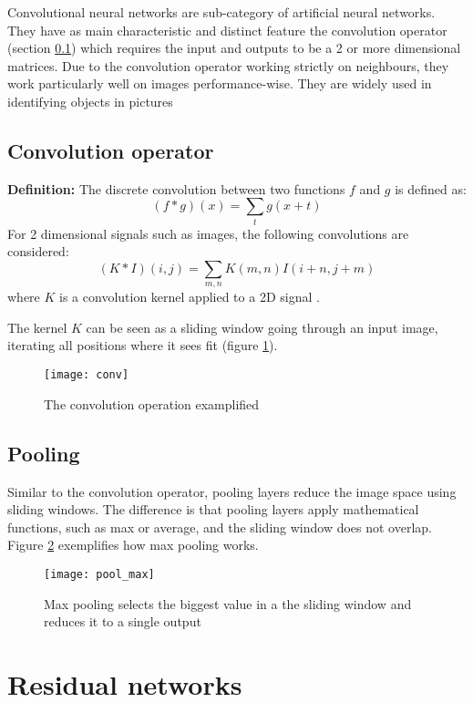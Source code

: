 Convolutional neural networks are sub-category of artificial neural networks. They have as main characteristic and distinct feature the convolution operator (section \ref{subsec:obj_cnn_conv}) which requires the input and outputs to be a 2 or more dimensional matrices. Due to the convolution operator working strictly on neighbours, they work particularly well on images performance-wise. They are widely used in identifying objects in pictures

\subsection{Convolution operator}
\label{subsec:obj_cnn_conv}

\textbf{Definition:} The discrete convolution between two functions $f$ and $g$ is defined as: 
\[ (f * g)(x) = \sum_{t}{g(x + t)} \] 
For 2 dimensional signals such as images, the following convolutions are considered: 
\[ (K * I)(i, j) = \sum_{m,n}{K(m, n)I(i + n, j + m)}\]
where $K$ is a convolution kernel applied to a 2D signal \cite{toulouse-nn}.

The kernel $K$ can be seen as a sliding window going through an input image, iterating all positions where it sees fit (figure \ref{fig:conv}).

\begin{figure}[b!]
\centering
\texttt{[image: conv]}
\caption{The convolution operation examplified}
\label{fig:conv}
\end{figure}


\subsection{Pooling}
\label{subsec:obj_cnn_pooling}

Similar to the convolution operator, pooling layers reduce the image space using sliding windows. The difference is that pooling layers apply mathematical functions, such as max or average, and the sliding window does not overlap. Figure \ref{fig:pool_max} exemplifies how max pooling works.

\begin{figure}[b!]
\centering
\texttt{[image: pool\_max]}
\caption{Max pooling selects the biggest value in a the sliding window and reduces it to a single output}
\label{fig:pool_max}
\end{figure}

\section{Residual networks}
\label{sec:obj_resnet}

